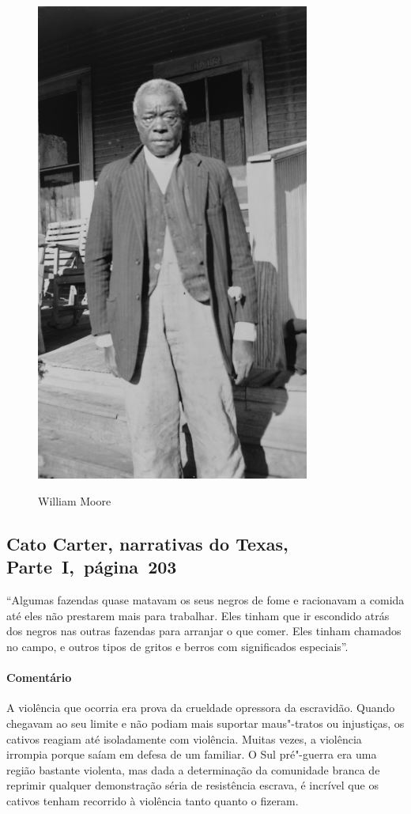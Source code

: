 \begin{figure}[]
\centering
 \includegraphics[width=90mm]{./imgs/williammoore_recorte.jpg} \label{img19}
\caption{William Moore}
\end{figure}

\subsection{Cato Carter, narrativas do Texas, Parte~I,~página~203} \label{ref53}

``Algumas fazendas quase matavam os seus negros de fome e racionavam a
comida até eles não prestarem mais para trabalhar. Eles tinham que ir
escondido atrás dos negros nas outras fazendas para arranjar o que
comer. Eles tinham chamados no campo, e outros tipos de gritos e berros
com significados especiais''.

\paragraph{Comentário}\quad
{\small
A violência que ocorria era prova da crueldade opressora da
escravidão. Quando
chegavam ao seu limite e não podiam mais suportar maus"-tratos ou
injustiças, os cativos reagiam até isoladamente com violência. Muitas vezes, a violência irrompia porque saíam em defesa de um familiar. O Sul pré"-guerra era uma região
bastante violenta, mas dada a determinação da comunidade branca de
reprimir qualquer demonstração séria de resistência escrava, é incrível que os cativos tenham recorrido à violência tanto quanto o fizeram.
}

